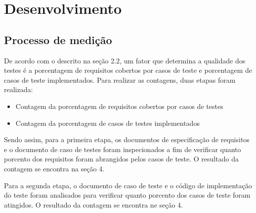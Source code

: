 \chapter[Desenvolvimento ]{Desenvolvimento}

\section{Processo de medição}
De acordo com o descrito na seção 2.2, um fator que determina a qualidade dos testes é a porcentagem de requisitos cobertos por casos de teste e porcentagem de casos de teste implementados. Para realizar as contagens, duas etapas foram realizada:

\begin{itemize}

	\item Contagem da porcentagem de requisitos cobertos por casos de testes
	\item Contagem da porcentagem de casos de testes implementados
	
\end{itemize}

Sendo assim, para a primeira etapa, os documentos de especificação de requisitos e o documento de caso de testes foram inspecionados a fim de verificar quanto porcento dos requisitos foram abrangidos pelos casos de teste. O resultado da contagem se encontra na seção 4.

Para a segunda etapa, o documento de caso de teste e o código de implementação do teste foram analisados para verificar quanto porcento dos casos de teste foram atingidos. O resultado da contagem se encontra ne seção 4.